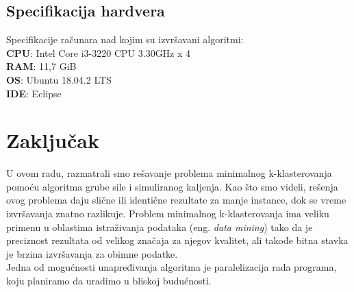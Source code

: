 \documentclass[a4paper]{article}
\begin{document}
\subsection{Specifikacija hardvera}
Specifikacije računara nad kojim su izvršavani algoritmi:\\
\textbf{CPU}: Intel Core i3-3220 CPU 3.30GHz x 4 \\
\textbf{RAM}: 11,7 GiB \\
\textbf{OS}: Ubuntu 18.04.2 LTS \\
\textbf{IDE}: Eclipse


\section{Zaključak}
U ovom radu, razmatrali smo rešavanje problema minimalnog k-klasterovanja pomoću algoritma grube sile i simuliranog kaljenja. Kao što smo videli, rešenja ovog problema daju slične ili identične rezultate za manje instance, dok se vreme izvršavanja znatno razlikuje. Problem minimalnog  
k-klasterovanja ima veliku primenu u oblastima istraživanja podataka (eng. \textit{data mining})
tako da je preciznost rezultata od velikog značaja za njegov kvalitet, ali takođe bitna stavka je brzina izvršavanja za obimne podatke.\\

Jedna od mogućnosti unapređivanja algoritma je paralelizacija rada programa, koju
planiramo da uradimo u bliskoj budućnosti.


\pagebreak

\appendix


\appendix
\end{document}
